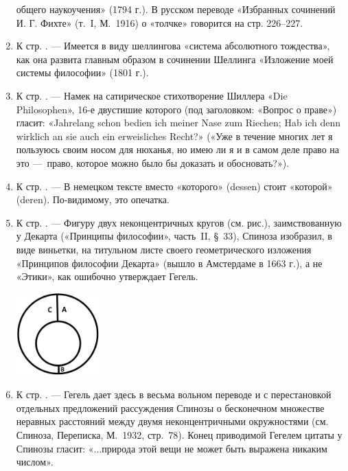 \begin{enumerate}
общего наукоучения» (1794 г.). В русском переводе «Избранных сочинений И.
Г. Фихте» (т.~I, М.~1916) о «толчке» говорится на стр. 226–227.
\item \label{bkm:Ref474665876}К стр. \pageref{bkm:bm44}. — Имеется в виду
шеллингова «система абсолютного тождества», как она развита главным образом
в сочинении Шеллинга «Изложение моей системы философии» (1801 г.).
\item \label{bkm:Ref474665904}К стр. \pageref{bkm:bm45}. — Намек на
сатирическое стихотворение Шиллера «Die Philosophen», 16-е двустишие
которого (под заголовком: «Вопрос о праве») гласит:\newline
«Jahrelang schon bedien ich meiner Nase zum Riechen;\newline
Hab ich denn wirklich an sie auch ein erweisliches Recht?»\newline
(«Уже в течение многих лет я пользуюсь своим носом для нюханья, но имею ли я
и в самом деле право на это —~право, которое можно было бы доказать и
обосновать?»).
\item \label{bkm:Ref474665953}К стр. \pageref{bkm:bm46}. — В немецком тексте
вместо «которого» (dessen) стоит «которой» (deren). По-видимому, это
опечатка.
\item \label{bkm:Ref474665962} К стр. \pageref{bkm:bm47}. — Фигуру двух
неконцентричных кругов (см. рис.), заимствованную у Декарта («Принципы
философии», часть~II, §~33), Спиноза изобразил, в виде виньетки, на
титульном листе своего геометрического изложения «Принципов философии
Декарта» (вышло в Амстердаме в 1663 г.), а не «Этики», как ошибочно
утверждает Гегель.
\begin{center}
\includegraphics[width=1.25in,height=1.25in]{hegel-img002.png}
\end{center}
\item \label{bkm:Ref474665968}К стр. \pageref{bkm:bm48}. — Гегель дает здесь
в весьма вольном переводе и с перестановкой отдельных предложений
рассуждения Спинозы о бесконечном множестве неравных расстояний между двумя
неконцентричными окружностями (см. Спиноза, Переписка, М.~1932, стр.~78).
Конец приводимой Гегелем цитаты у Спинозы гласит: «...природа этой вещи не
может быть выражена никаким числом».

\end{enumerate}
